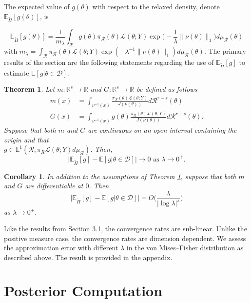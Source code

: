 \documentclass[10pt,fleqn]{article}
\newtheorem{theorem}{Theorem} \newtheorem{lemma}{Lemma}
\newtheorem{corollary}{Corollary} \newtheorem{remark}{Remark}
\newcommand{\bb}[1]{\mathbb{#1}} \newcommand{\mc}[1]{\mathcal{#1}}
\DeclareMathOperator{\1}{\mathbbm{1}} \DeclareMathOperator{\bigO}{\mc O}
\begin{document}
The expected value of
$g(\theta)$ with respect to the relaxed density, denote
$\bb E_{\tilde{\Pi}}[g(\theta)] $, is

$$\bb E_{\tilde{\Pi}}[g(\theta)] = \frac{1}{m_\lambda}
\int_\mathcal{R} g(\theta) \pi_\mathcal{R}(\theta)
\mathcal{L}(\theta;Y)\exp\bigg(-\frac{1}{\lambda}\|\nu (\theta)\|_1\bigg)
d\mu_\mathcal{R}(\theta) $$
with $m_\lambda =
\int_\mathcal{R}  \pi_\mathcal{R}(\theta)
\mathcal{L}(\theta;Y)\exp(-{\lambda^{-1}}\|\nu (\theta)\|_1)
d\mu_\mathcal{R}(\theta).$
The primary results of the section are the following statements regarding
the use of $\bb E_{\tilde{\Pi}}[g]$ to estimate $\bb E[g|\theta\in\mathcal{D}]$.

\begin{theorem} \label{THM:Relaxed_Expectation_Convergence_Measure_Zero}
Let $m:\mathbb{R}^s\to \mathbb{R}$ and $G:\mathbb{R}^s\to
\mathbb{R}$ be defined as follows \begin{align*} m(x) & =
\int_{\nu^{-1}(x)} \frac{\pi_\mathcal{R}(\theta)
\mathcal{L}(\theta;Y)}{J(\nu(\theta))}
d\mathcal{R}^{r-s}(\theta) \\ G(x) &= \int_{\nu^{-1}(x)}
g(\theta)\frac{\pi_\mathcal{R}(\theta)
\mathcal{L}(\theta;Y)}{J(\nu(\theta))} d\mathcal{R}^{r-s}(\theta).
\end{align*} Suppose that both $m$ and $G$ are continuous on an open
interval containing the origin and that \\
$g\in\mathbb{L}^1(\mathcal{R},\pi_R\mathcal{L}(\theta;Y)d\mu_\mathcal{R})$.
Then, $$\bigg|\bb E_{\tilde{\Pi}}[g] - \bb E[g|\theta \in \mathcal{D}]\bigg| \to 0
\text{ as } \lambda\to 0^+.$$ \end{theorem}

\begin{corollary} In addition to the assumptions of Theorem
\ref{THM:Relaxed_Expectation_Convergence_Measure_Zero}, suppose
that both $m$ and $G$ are differentiable at $0$. Then
$$\bigg|\bb E_{\tilde{\Pi}}[g] - \bb E[g|\theta \in \mathcal{D}] \bigg| =
O\bigg(\frac{\lambda}{|\log \lambda|^s}\bigg)$$ as $\lambda \to
0^+.$ \end{corollary}

Like the results from Section 3.1, the convergence rates are sub-linear. Unlike the positive measure case, the convergence rates are dimension dependent. We assess the approximation error with different $\lambda$ in the von Mises--Fisher distribution as described above. The result is provided in the appendix. 


\section{Posterior Computation}
\end{document}
